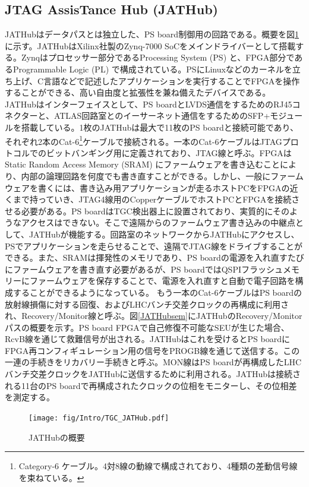         \subsection*{JTAG AssisTance Hub (JATHub)}
    JATHubはデータパスとは独立した、PS board制御用の回路である。概要を図\ref{TGC_JATHub}に示す。JATHubはXilinx社製のZynq-7000 SoCをメインドライバーとして搭載する。Zynqはプロセッサー部分であるProcessing System  (PS) と、FPGA部分であるProgrammable Logic  (PL) で構成されている。PSにLinuxなどのカーネルを立ち上げ、C言語などで記述したアプリケーションを実行することでFPGAを操作することができる、高い自由度と拡張性を兼ね備えたデバイスである。
    JATHubはインターフェイスとして、PS boardとLVDS通信をするためのRJ45コネクターと、ATLAS回路室とのイーサーネット通信をするためのSFP+モジュールを搭載している。1枚のJATHubは最大で11枚のPS boardと接続可能であり、それぞれ2本のCat-6\footnote{Category-6 ケーブル。4対8線の動線で構成されており、4種類の差動信号線を束ねている。}ケーブルで接続される。一本のCat-6ケーブルはJTAGプロトコルでのビットバンギング用に定義されており、JTAG線と呼ぶ。FPGAはStatic Random Access Memory  (SRAM) にファームウェアを書き込むことにより、内部の論理回路を何度でも書き直すことができる。しかし、一般にファームウェアを書くには、書き込み用アプリケーションが走るホストPCをFPGAの近くまで持っていき、JTAG4線用のCopperケーブルでホストPCとFPGAを接続させる必要がある。PS boardはTGC検出器上に設置されており、実質的にそのようなアクセスはできない。そこで遠隔からのファームウェア書き込みの中継点として、JATHubが機能する。回路室のネットワークからJATHubにアクセスし、PSでアプリケーションを走らせることで、遠隔でJTAG線をドライブすることができる。また、SRAMは揮発性のメモリであり、PS boardの電源を入れ直すたびにファームウェアを書き直す必要があるが、PS boardではQSPIフラッシュメモリーにファームウェアを保存することで、電源を入れ直すと自動で電子回路を構成することができるようになっている。
    もう一本のCat-6ケーブルはPS boardの放射線損傷に対する回復、およびLHCバンチ交差クロックの再構成に利用され、Recovery/Monitor線と呼ぶ。図\ref{JATHubsem}にJATHubのRecovery/Monitorパスの概要を示す。PS board FPGAで自己修復不可能なSEUが生じた場合、RcvB線を通じて救難信号が出される。JATHubはこれを受けるとPS boardにFPGA再コンフィギュレーション用の信号をPROGB線を通じて送信する。この一連の手続きをリカバリー手続きと呼ぶ。MON線はPS boardが再構成したLHCバンチ交差クロックをJATHubに送信するために利用される。JATHubは接続される11台のPS boardで再構成されたクロックの位相をモニターし、その位相差を測定する。

    \begin{figure} 
        \centering
        \texttt{[image: fig/Intro/TGC\_JATHub.pdf]}
        \caption[JATHubの概要]{JATHubの概要}
        \label{TGC_JATHub}
    \end{figure}

